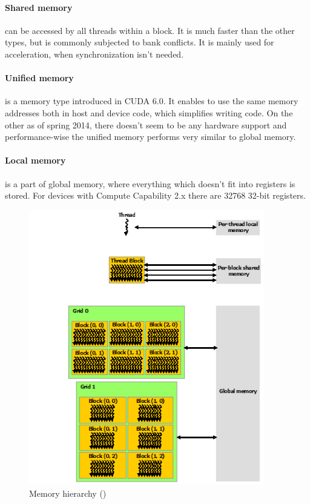 \paragraph{Shared memory} can be accessed by all threads within a block. It is much faster than the other types, but is commonly subjected to bank conflicts. It is mainly used for acceleration, when synchronization isn't needed.

\paragraph{Unified memory} is a memory type introduced in CUDA 6.0. It enables to use the same memory addresses both in host and device code, which simplifies writing code. On the other as of spring 2014, there doesn't seem to be any hardware support \cite{unified-memory} and performance-wise the unified memory performs very similar to global memory.

\paragraph{Local memory} is a part of global memory, where everything which doesn't fit into registers is stored. For devices with Compute Capability 2.x there are 32768 32-bit registers.

\begin{center}
\begin{figure}[h]
	\centering\includegraphics[height=12cm]{fig/memory-hierarchy.png}
	\caption{Memory hierarchy (\cite{cuda-toolkit-docs})}
\end{figure}
\end{center}

